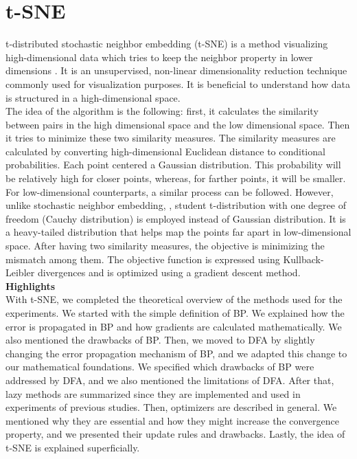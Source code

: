 \documentclass[a4paper, nobind]{templates/ociamthesis}
\begin{document}
\hypertarget{t-sne}{%
\section{t-SNE}\label{t-sne}}

t-distributed stochastic neighbor embedding (t-SNE) is a method visualizing high-dimensional data which tries to keep the neighbor property in lower dimensions \cite{vanDerMaaten2008}. It is an unsupervised, non-linear dimensionality reduction technique commonly used for visualization purposes. It is beneficial to understand how data is structured in a high-dimensional space.\\
The idea of the algorithm is the following: first, it calculates the similarity between pairs in the high dimensional space and the low dimensional space. Then it tries to minimize these two similarity measures. The similarity measures are calculated by converting high-dimensional Euclidean distance to conditional probabilities. Each point centered a Gaussian distribution. This probability will be relatively high for closer points, whereas, for farther points, it will be smaller. For low-dimensional counterparts, a similar process can be followed. However, unlike stochastic neighbor embedding, \cite{Hinton_Roweis_2003}, student t-distribution with one degree of freedom (Cauchy distribution) is employed instead of Gaussian distribution. It is a heavy-tailed distribution that helps map the points far apart in low-dimensional space. After having two similarity measures, the objective is minimizing the mismatch among them. The objective function is expressed using Kullback-Leibler divergences and is optimized using a gradient descent method.\\

\noindent \textbf{Highlights}\\
\noindent With t-SNE, we completed the theoretical overview of the methods used for the experiments. We started with the simple definition of BP. We explained how the error is propagated in BP and how gradients are calculated mathematically. We also mentioned the drawbacks of BP. Then, we moved to DFA by slightly changing the error propagation mechanism of BP, and we adapted this change to our mathematical foundations. We specified which drawbacks of BP were addressed by DFA, and we also mentioned the limitations of DFA. After that, lazy methods are summarized since they are implemented and used in experiments of previous studies. Then, optimizers are described in general. We mentioned why they are essential and how they might increase the convergence property, and we presented their update rules and drawbacks. Lastly, the idea of t-SNE is explained superficially.
\end{document}
